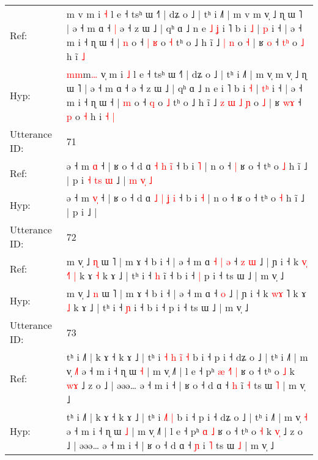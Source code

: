 \documentclass[10pt]{article}
\DeclareRobustCommand{\hl}[1]{{\textcolor{red}{#1}}}
\begin{document}
\begin{longtable}{ll}
Ref: & \hl{}\hl{}m\hl{} v\hl{} m i \hl{˧} l e ˧ tsʰ ɯ ˧˥ | dʑ o ˩ | tʰ i ˩˥ | m v\hl{} m v̩ ˩ ɳ ɯ ˥ | ə ˧ m ɑ ˧\hl{ }\hl{|} ə ˧ z ɯ ˩ | qʰ ɑ ˩ n e\hl{ }\hl{˩}\hl{ }\hl{ʝ} i ˥ b i \hl{˩} | \hl{}\hl{p} i ˧ | ə ˧ m i ˧ ɳ ɯ ˧ | \hl{n} o ˧\hl{ }\hl{|} \hl{ʁ} o \hl{˧} tʰ o ˩ h ĩ ˩\hl{}\hl{}\hl{}\hl{} \hl{|} \hl{n} o \hl{˧} | ʁ \hl{}\hl{o} ˧ \hl{t}\hl{ʰ} o \hl{˩} h i\hl{}\hl{̃} \hl{˩}
 \\
Hyp: & \hl{m}\hl{m}m\hl{…} v\hl{̩} m i \hl{˩} l e ˧ tsʰ ɯ ˧˥ | dʑ o ˩ | tʰ i ˩˥ | m v\hl{̩} m v̩ ˩ ɳ ɯ ˥ | ə ˧ m ɑ ˧\hl{}\hl{} ə ˧ z ɯ ˩ | qʰ ɑ ˩ n e\hl{}\hl{}\hl{}\hl{} i ˥ b i \hl{˧} | \hl{t}\hl{ʰ} i ˧ | ə ˧ m i ˧ ɳ ɯ ˧ | \hl{m} o ˧\hl{}\hl{} \hl{q} o \hl{˩} tʰ o ˩ h ĩ ˩\hl{ }\hl{z}\hl{ }\hl{ɯ} \hl{˩} \hl{ɲ} o \hl{˩} | ʁ \hl{w}\hl{ɤ} ˧ \hl{}\hl{p} o \hl{˧} h i\hl{ }\hl{˧} \hl{|}
 \\
\midrule
Utterance ID: & 71 \\
Ref: & ə ˧ m \hl{}\hl{ɑ} ˧ | ʁ o ˧ d ɑ \hl{˧} \hl{h} \hl{}\hl{i}\hl{̃} ˧ b i \hl{˥} | n o ˧\hl{ }\hl{|} ʁ o ˧ tʰ o \hl{˩} h ĩ ˩ | p i\hl{ }\hl{˧}\hl{ }\hl{t}\hl{s}\hl{ }\hl{ɯ} ˩ |\hl{ }\hl{m}\hl{ }\hl{v}\hl{̩}\hl{ }\hl{˩}
 \\
Hyp: & ə ˧ m \hl{v}\hl{̩} ˧ | ʁ o ˧ d ɑ \hl{˩} \hl{|} \hl{ʝ}\hl{ }\hl{i} ˧ b i \hl{˧} | n o ˧\hl{}\hl{} ʁ o ˧ tʰ o \hl{˧} h ĩ ˩ | p i\hl{}\hl{}\hl{}\hl{}\hl{}\hl{}\hl{} ˩ |\hl{}\hl{}\hl{}\hl{}\hl{}\hl{}\hl{}
 \\
\midrule
Utterance ID: & 72 \\
Ref: & m v̩ ˩ \hl{ɳ} ɯ ˥ | m ɤ ˧ b i ˧ | ə ˧ m ɑ\hl{ }\hl{˧}\hl{ }\hl{|}\hl{ }\hl{ə} ˧\hl{ }\hl{z} \hl{ɯ} ˩ | ɲ i ˧ k \hl{v}\hl{̩} \hl{˧}˥\hl{ }\hl{|} k ɤ \hl{˧} k ɤ ˩ | tʰ i ˧ \hl{h} i\hl{̃} ˧ b i ˧\hl{ }\hl{|} p i ˧ ts ɯ ˩ | m v̩ ˩
 \\
Hyp: & m v̩ ˩ \hl{n} ɯ ˥ | m ɤ ˧ b i ˧ | ə ˧ m ɑ\hl{}\hl{}\hl{}\hl{}\hl{}\hl{} ˧\hl{}\hl{} \hl{o} ˩ | ɲ i ˧ k \hl{w}\hl{ɤ} \hl{}˥\hl{}\hl{} k ɤ \hl{˩} k ɤ ˩ | tʰ i ˧ \hl{ɲ} i\hl{} ˧ b i ˧\hl{}\hl{} p i ˧ ts ɯ ˩ | m v̩ ˩
 \\
\midrule
Utterance ID: & 73 \\
Ref: & tʰ i ˩˥ | k ɤ ˧ k ɤ ˩ | tʰ i\hl{ }\hl{˧}\hl{ }\hl{h} \hl{i}\hl{̃} \hl{˧} b i ˧ p i ˧ dʑ o ˩ | tʰ i ˩˥ | m v̩ \hl{˩}\hl{˥} ə ˧ m i ˧ ɳ ɯ \hl{˧} | m v̩ ˩˥ | l e ˧ pʰ\hl{ }\hl{æ} \hl{˧}\hl{˥} \hl{|} ʁ o ˧ tʰ o \hl{˩} k \hl{w}\hl{ɤ} ˩ z o ˩ | əəə… ə ˧ m i ˧ | ʁ o ˧ d ɑ ˧ \hl{h} i\hl{̃} \hl{˧} ts ɯ \hl{˥} | m v̩ ˩
 \\
Hyp: & tʰ i ˩˥ | k ɤ ˧ k ɤ ˩ | tʰ i\hl{}\hl{}\hl{}\hl{} \hl{˩}\hl{˥} \hl{|} b i ˧ p i ˧ dʑ o ˩ | tʰ i ˩˥ | m v̩ \hl{}\hl{˧} ə ˧ m i ˧ ɳ ɯ \hl{˩} | m v̩ ˩˥ | l e ˧ pʰ\hl{}\hl{} \hl{}\hl{ɑ} \hl{˩} ʁ o ˧ tʰ o \hl{˧} k \hl{v}\hl{̩} ˩ z o ˩ | əəə… ə ˧ m i ˧ | ʁ o ˧ d ɑ ˧ \hl{ɲ} i\hl{} \hl{˥} ts ɯ \hl{˩} | m v̩ ˩

\end{longtable}
\end{document}

